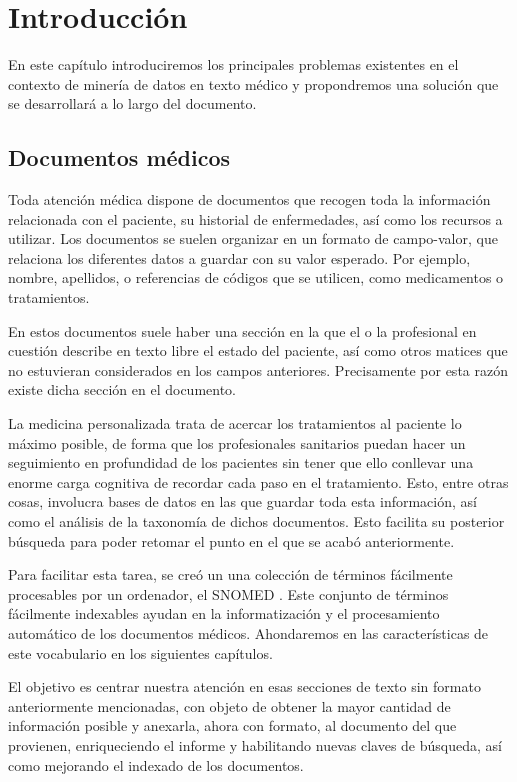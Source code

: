 \chapter{Introducción}

En este capítulo introduciremos los principales problemas existentes en el contexto de minería de datos en texto médico y propondremos una solución que se desarrollará a lo largo del documento.

\section{Documentos médicos}

Toda atención médica dispone de documentos que recogen toda la información relacionada con el paciente, su historial de enfermedades, así como los recursos a utilizar. Los documentos se suelen organizar en un formato de campo-valor, que relaciona los diferentes datos a guardar con su valor esperado. Por ejemplo, nombre, apellidos, o referencias de códigos que se utilicen, como medicamentos o tratamientos.

En estos documentos suele haber una sección en la que el o la profesional en cuestión describe en texto libre el estado del paciente, así como otros matices que no estuvieran considerados en los campos anteriores. Precisamente por esta razón existe dicha sección en el documento.

La medicina personalizada trata de acercar los tratamientos al paciente lo máximo posible, de forma que los profesionales sanitarios puedan hacer un seguimiento en profundidad de los pacientes sin tener que ello conllevar una enorme carga cognitiva de recordar cada paso en el tratamiento. Esto, entre otras cosas, involucra bases de datos en las que guardar toda esta información, así como el análisis de la taxonomía de dichos documentos. Esto facilita su posterior búsqueda para poder retomar el punto en el que se acabó anteriormente.

Para facilitar esta tarea, se creó un una colección de términos fácilmente procesables por un ordenador, el SNOMED \cite{snomed}. Este conjunto de términos fácilmente indexables ayudan en la informatización y el procesamiento automático de los documentos médicos. Ahondaremos en las características de este vocabulario en los siguientes capítulos.

El objetivo es centrar nuestra atención en esas secciones de texto sin formato anteriormente mencionadas, con objeto de obtener la mayor cantidad de información posible y anexarla, ahora con formato, al documento del que provienen, enriqueciendo el informe y habilitando nuevas claves de búsqueda, así como mejorando el indexado de los documentos.


